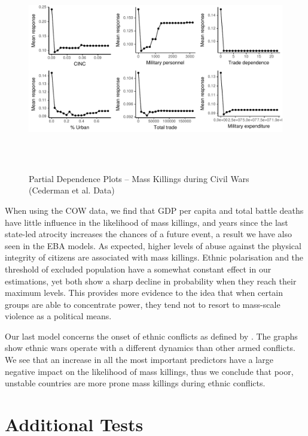 \begin{figure}[h!]
\begin{center}
\includegraphics[width=\textwidth, height=9cm]{images/drfdpp4.pdf}
\caption{Partial Dependence Plots -- Mass Killings during Civil Wars (Cederman et al. Data)}
\label{fig:drfdpp4}
\end{center}
\end{figure}

\newpage

When using the COW data, we find that GDP per capita and total battle deaths have little influence in the likelihood of mass killings, and years since the last state-led atrocity increases the chances of a future event, a result we have also seen in the EBA models. As expected, higher levels of abuse against the physical integrity of citizens are associated with mass killings. Ethnic polarisation and the threshold of excluded population have a somewhat constant effect in our estimations, yet both show a sharp decline in probability when they reach their maximum levels. This provides more evidence to the idea that when certain groups are able to concentrate power, they tend not to resort to mass-scale violence as a political means.

Our last model concerns the onset of ethnic conflicts as defined by \citet{cederman2010ethnic}. The graphs show ethnic wars operate with a different dynamics than other armed conflicts. We see that an increase in all the most important predictors have a large negative impact on the likelihood of mass killings, thus we conclude that poor, unstable countries are more prone mass killings during ethnic conflicts.

\section{Additional Tests}
\label{sec:additional-tests4}

